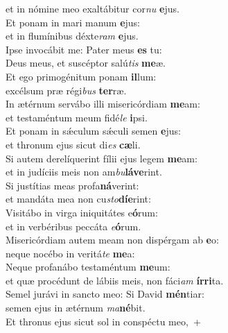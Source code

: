 \evenverse et in nómine meo exaltábitur cor\textit{nu} \textbf{e}jus.\\
\oddverse Et ponam in mari manum \textbf{e}jus:~\*\\
\oddverse et in flumínibus déxte\textit{ram} \textbf{e}jus.\\
\evenverse Ipse invocábit me: Pater meus \textbf{es} tu:~\*\\
\evenverse Deus meus, et suscéptor salú\textit{tis} \textbf{me}æ.\\
\oddverse Et ego primogénitum ponam \textbf{il}lum:~\*\\
\oddverse excélsum præ régi\textit{bus} \textbf{ter}ræ.\\
\evenverse In ætérnum servábo illi misericórdiam \textbf{me}am:~\*\\
\evenverse et testaméntum meum fidé\textit{le} \textbf{i}psi.\\
\oddverse Et ponam in sǽculum sǽculi semen \textbf{e}jus:~\*\\
\oddverse et thronum ejus sicut di\textit{es} \textbf{cæ}li.\\
\evenverse Si autem derelíquerint fílii ejus legem \textbf{me}am:~\*\\
\evenverse et in judíciis meis non am\textit{bu}\textbf{lá}\textbf{ve}rint.\\
\oddverse Si justítias meas profa\textbf{ná}verint:~\*\\
\oddverse et mandáta mea non cu\textit{sto}\textbf{dí}\textbf{e}rint:\\
\evenverse Visitábo in virga iniquitátes e\textbf{ó}rum:~\*\\
\evenverse et in verbéribus peccáta \textit{e}\textbf{ó}rum.\\
\oddverse Misericórdiam autem meam non dispérgam ab \textbf{e}o:~\*\\
\oddverse neque nocébo in veritá\textit{te} \textbf{me}a:\\
\evenverse Neque profanábo testaméntum \textbf{me}um:~\*\\
\evenverse et quæ procédunt de lábiis meis, non fáci\textit{am} \textbf{ír}\textbf{ri}ta.\\
\oddverse Semel jurávi in sancto meo: Si David \textbf{mén}tiar:~\*\\
\oddverse semen ejus in ætérnum \textit{ma}\textbf{né}bit.\\
\evenverse Et thronus ejus sicut sol in conspéctu meo,~+\\
